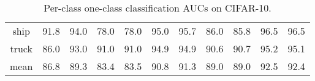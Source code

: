 \documentclass{article} \usepackage{iclr2021_conference,times}
\begin{document}
\begin{table}[ht]
{\begin{tabular}{c|c|c|c|c|c|c|c|c|c|c}
        ship & 91.8{\scriptsize} & 94.0{\scriptsize} & 78.0{\scriptsize} & 78.0{\scriptsize} & 95.0{\scriptsize} & 95.7{\scriptsize} & 86.0{\scriptsize} & 85.8{\scriptsize} & 96.5{\scriptsize} & 96.5{\scriptsize} \\
        truck & 86.0{\scriptsize} & 93.0{\scriptsize} & 91.0{\scriptsize} & 91.0{\scriptsize} & 94.9{\scriptsize} & 94.9{\scriptsize} & 90.6{\scriptsize} & 90.7{\scriptsize} & 95.2{\scriptsize} & 95.1{\scriptsize} \\
        \midrule
        mean & 86.8{\scriptsize} & 89.3{\scriptsize} & 83.4{\scriptsize} & 83.5{\scriptsize} & 90.8{\scriptsize} & 91.3{\scriptsize} & 89.0{\scriptsize} & 89.0{\scriptsize} & 92.5{\scriptsize} & 92.4{\scriptsize} \\        
        \bottomrule
    \end{tabular}
    }
    \caption{Per-class one-class classification AUCs on CIFAR-10.}
    \label{tab:per_class_aucs_cifar10}
\end{table}
\end{document}
